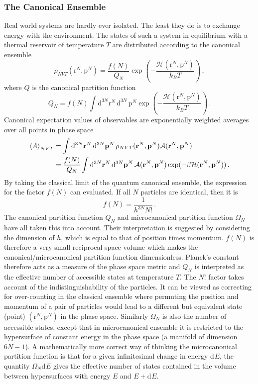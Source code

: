 \documentclass{article}
\theoremstyle{plain}\theoremheaderfont{\normalfont\itshape}\theorembodyfont{\rmfamily}\theoremseparator{.}\newtheorem*{rem}{Remark}\newtheorem*{ex}{Example}\newtheorem*{proof}{Proof}\newtheorem*{altp}{Alternative proof}
\theoremstyle{plain}\theoremheaderfont{\normalfont\bfseries}\theorembodyfont{\rmfamily}\theoremseparator{.}\newtheorem{thm}{Theorem}[section]\newtheorem{lem}[thm]{Lemma}\newtheorem{prop}[thm]{Proposition}\newtheorem*{cor}{Corollary}\newtheorem{defn}[thm]{Definition}\newtheorem{clm}[thm]{Claim}\newtheorem{clminproof}{Claim}\newtheorem{alg}[thm]{Algorithm}\newtheorem{hyp}[thm]{Hypothesis}\newtheorem{law}[thm]{Law}
\theoremstyle{break}\theoremheaderfont{\normalfont\itshape}\theorembodyfont{\rmfamily}\theoremseparator{.\medskip}\newtheorem*{proofskip}{Proof}\newtheorem*{exs}{Examples}\newtheorem*{rems}{Remarks}
\theoremstyle{break}\theoremheaderfont{\normalfont\bfseries}\theorembodyfont{\rmfamily}\theoremseparator{.\medskip}\newtheorem{lemskip}[thm]{Lemma}\newtheorem{defnskip}[thm]{Definition}\newtheorem{propskip}[thm]{Proposition}\newtheorem{thmskip}[thm]{Theorem}
\numberwithin{equation}{section}
\newcommand{\dd}[2][]{\mathrm{d}^{#1} #2\,}
\renewcommand{\d}[2][]{\mathrm{d}^{#1} #2}
\newcommand{\eval}[1]{\left\langle #1 \right\rangle}
\newcommand{\vb}[1]{\bm{\mathrm{#1}}}
\begin{document}
    \subsubsection{The Canonical Ensemble}
    Real world systems are hardly ever isolated. The least they do is to exchange energy with the environment. The states of such a system in equilibrium with a thermal reservoir of temperature \(T\) are distributed according to the canonical ensemble
    \begin{equation}\label{canonical_state_distribution}
        \rho_{NVT}(\vb{r}^N,\vb{p}^N)=\frac{f(N)}{Q_N}\exp\left(-\frac{\mathcal{H}(\vb{r}^N,\vb{p}^N)}{k_B T}\right)\,,
    \end{equation}
    where \(Q\) is the canonical partition function
    \begin{equation}
        Q_N=f(N)\int\dd[3N]{\vb{r}^N}\dd[3N]\vb{\vb{p}^N}\exp\left(-\frac{\mathcal{H}(\vb{r}^N,\vb{p}^N)}{k_B T}\right)\,.
    \end{equation}
    Canonical expectation values of observables are exponentially weighted averages over all points in phase space
    \begin{align}
        \eval{A}_{NVT}&=\int\dd[3N]{\vb{r}^N}\dd[3N]{\vb{p}^N}\rho_{NVT}(\vb{r}^N,\vb{p}^N)\mathcal{A}(\vb{r}^N,\vb{p}^N)\notag\\
        &=\frac{f(N)}{Q_N}\int\dd[3N]{\vb{r}^N}\dd[3N]{\vb{p}^N}\mathcal{A}(\vb{r}^N,\vb{p}^N)\exp(-\beta \mathcal{H}(\vb{r}^N,\vb{p}^N))\,.\label{canonical_average}
    \end{align}
    By taking the classical limit of the quantum canonical ensemble, the expression for the factor \(f(N)\) can evaluated. If all \(N\) particles are identical, then it is
    \begin{equation}
        f(N)=\frac{1}{h^{3N}N!}\,.
    \end{equation}
    The canonical partition function \(Q_N\) and microcanonical partition function \(\Omega_N\) have all taken this into account. Their interpretation is suggested by considering the dimension of \(h\), which is equal to that of position times momentum. \(f(N)\) is therefore a very small reciprocal space volume which makes the canonical/microcanonical partition function dimensionless. Planck's constant therefore acts as a measure of the phase space metric and \(Q_N\) is interpreted as the effective number of accessible states at temperature \(T\). The \(N!\) factor takes account of the indistinguishability of the particles. It can be viewed as correcting for over-counting in the classical ensemble where permuting the position and momentum of a pair of particles would lead to a different but equivalent state (point) \((\vb{r}^N,\vb{p}^N)\) in the phase space. Similarly \(\Omega_N\) is also the number of accessible states, except that in microcanonical ensemble it is restricted to the hypersurface of constant energy in the phase space (a manifold of dimension \(6N-1\)). A mathematically more correct way of thinking the microcanonical partition function is that for a given infinitesimal change in energy \(\d{E}\), the quantity \(\Omega_N\d{E}\) gives the effective number of states contained in the volume between hypersurfaces with energy \(E\) and \(E+\d{E}\).
\end{document}

